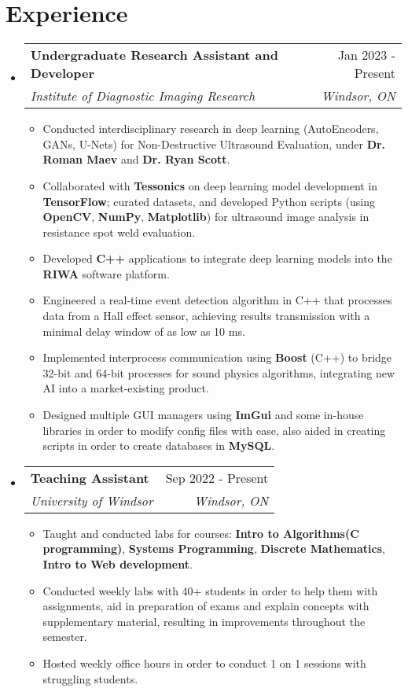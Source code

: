 \documentclass[letterpaper,11pt]{article}
\makeatletter
\newcommand{\resumeItem}[1]{
  \item\small{
    {#1 \vspace{-2pt}}
  }
}
\newcommand{\resumeSubheading}[4]{
  \vspace{-2pt}\item
    \begin{tabular*}{0.97\textwidth}[t]{l@{\extracolsep{\fill}}r}
      \textbf{#1} & #2 \\
      \textit{\small#3} & \textit{\small #4} \\
    \end{tabular*}\vspace{-7pt}
}
\newcommand{\resumeSubHeadingListStart}{\begin{itemize}[leftmargin=0.15in, label={}]}
\newcommand{\resumeSubHeadingListEnd}{\end{itemize}}
\newcommand{\resumeItemListStart}{\begin{itemize}}
\newcommand{\resumeItemListEnd}{\end{itemize}\vspace{-5pt}}
\makeatother
\begin{document}
\section{Experience}
  \resumeSubHeadingListStart

    \resumeSubheading
      {Undergraduate Research Assistant and Developer}{Jan 2023 - Present}
      {Institute of Diagnostic Imaging Research}{Windsor, ON}
      \resumeItemListStart
        \resumeItem{Conducted interdisciplinary research in deep learning (AutoEncoders, GANs, U-Nets) for Non-Destructive Ultrasound Evaluation, under \textbf{Dr. Roman Maev} and \textbf{Dr. Ryan Scott}.}
        \resumeItem{Collaborated with \textbf{Tessonics} on deep learning model development in \textbf{TensorFlow}; curated datasets, and developed Python scripts (using \textbf{OpenCV}, \textbf{NumPy}, \textbf{Matplotlib}) for ultrasound image analysis in resistance spot weld evaluation.}
        \resumeItem{Developed \textbf{C++} applications to integrate deep learning models into the \textbf{RIWA} software platform.}
        \resumeItem{Engineered a real-time event detection algorithm in C++ that processes data from a Hall effect sensor, achieving results transmission with a minimal delay window of as low as 10 ms.}
        \resumeItem{Implemented interprocess communication using \textbf{Boost} (C++) to bridge 32-bit and 64-bit processes for sound physics algorithms, integrating new AI into a market-existing product. }
        \resumeItem{Designed multiple GUI managers using \textbf{ImGui} and some in-house libraries in order to modify config files with ease, also aided in creating scripts in order to create databases in \textbf{MySQL}. }
      \resumeItemListEnd
      

    \resumeSubheading
      {Teaching Assistant}{Sep 2022 - Present}
      {University of Windsor}{Windsor, ON}
      \resumeItemListStart
        \resumeItem{Taught and conducted labs for courses: \textbf{Intro to Algorithms(C programming)}, \textbf{Systems Programming}, \textbf{Discrete Mathematics}, \textbf{Intro to Web development}.}
        \resumeItem{Conducted weekly labs with 40+ students in order to help them with assignments, aid in preparation of exams and explain concepts with supplementary material, resulting in improvements throughout the semester. }
        \resumeItem{Hosted weekly office hours in order to conduct 1 on 1 sessions with struggling students. }
    \resumeItemListEnd

  \resumeSubHeadingListEnd
\end{document}
